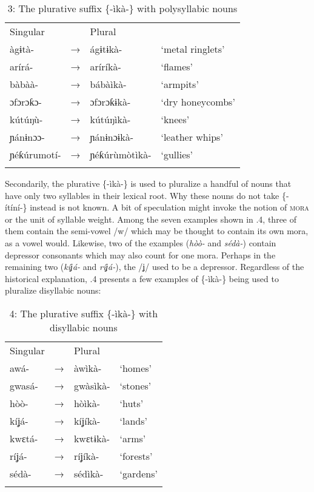 \begin{table}
\caption{3: The plurative suffix \{-ìkà-\} with polysyllabic nouns}
\label{tab:4}


\begin{tabularx}{\textwidth}{XXXX}
\lsptoprule

Singular &  & Plural & \\
àgɨtà- & → & ágɨtɨkà- & ‘metal ringlets’\\
arírá- & → & aríríkà- & ‘flames’\\
bàbàà- & → & bábàìkà- & ‘armpits’\\
ɔfɔrɔƙɔ- & → & ɔfɔrɔƙɨkà- & ‘dry honeycombs’\\
kútúŋù- & → & kútúŋìkà- & ‘knees’\\
ɲánɨnɔɔ- & → & ɲánɨnɔɨkà- & ‘leather whips’\\
ɲéƙúrumotí- & → & ɲéƙúrùmòtìkà- & ‘gullies’\\
\lspbottomrule
\end{tabularx}
\end{table}
Secondarily, the plurative \{-ìkà-\} is used to pluralize a handful of nouns that have only two syllables in their lexical root. Why these nouns do not take \{-ítíní-\} instead is not known. A bit of speculation might invoke the notion of \textsc{mora} or the unit of syllable weight. Among the seven examples shown in .4, three of them contain the semi-vowel /w/ which may be thought to contain its own mora, as a vowel would. Likewise, two of the examples (\textit{hòò-} and \textit{sédà-}) contain depressor consonants which may also count for one mora. Perhaps in the remaining two (\textit{kíʝá-} and \textit{ríʝá-}), the /ʝ/ used to be a depressor. Regardless of the historical explanation, .4 presents a few examples of \{-ìkà-\} being used to pluralize disyllabic nouns:


\begin{table}
\caption{4: The plurative suffix \{-ìkà-\} with disyllabic nouns}
\label{tab:4}


\begin{tabularx}{\textwidth}{XXXX}
\lsptoprule

Singular &  & Plural & \\
awá- & → & àwìkà- & ‘homes’\\
gwasá- & → & gwàsìkà- & ‘stones’\\
hòò- & → & hòìkà- & ‘huts’\\
kíʝá- & → & kíʝíkà- & ‘lands’\\
kwɛtá- & → & kwɛtɨkà- & ‘arms’\\
ríʝá- & → & ríʝíkà- & ‘forests’\\
sédà- & → & sédìkà- & ‘gardens’\\
\lspbottomrule
\end{tabularx}
\end{table}

